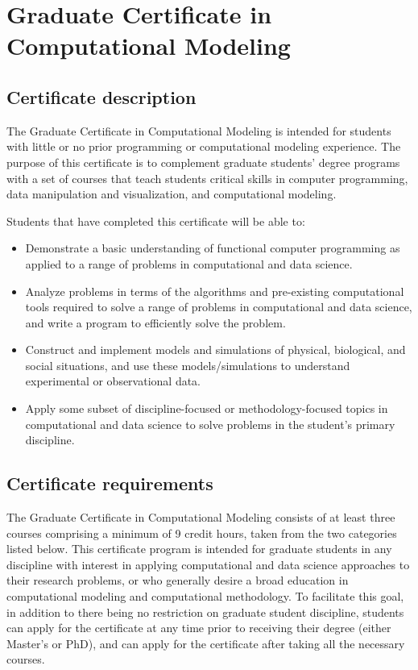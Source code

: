 \section{Graduate Certificate in Computational Modeling}
\label{sec:cert_model}

\subsection{Certificate description}

The Graduate Certificate in Computational Modeling is intended for
students with little or no prior programming or computational modeling
experience. The purpose of this certificate is to complement graduate
students' degree programs with a set of courses that teach students
critical skills in computer programming, data manipulation and
visualization, and computational modeling.  

\vspace{2mm}

\noindent
Students that have completed this certificate will be able to: 

\begin{itemize} 
\item  Demonstrate a basic understanding of functional computer
  programming as applied to a range of problems in computational and
  data science.  

\item  Analyze problems in terms of the algorithms and pre-existing
  computational tools required to solve a range of problems in
  computational and data science, and write a program to efficiently
  solve the problem.  

\item  Construct and implement models and simulations of physical,
  biological, and social situations, and use these models/simulations
  to understand experimental or observational data.  

\item  Apply some subset of discipline-focused or methodology-focused
topics in computational and data science to solve problems in the
student’s primary discipline.

\end{itemize}

\subsection{Certificate requirements}

The Graduate Certificate in Computational Modeling consists of at least
three courses comprising a minimum of 9 credit hours, taken from the
two categories listed below.  This certificate program is intended for
graduate students in any discipline with interest in applying
computational and data science approaches to their research problems,
or who generally desire a broad education in computational modeling
and computational methodology.  To facilitate this goal, in addition
to there being no restriction on graduate student discipline, students
can apply for the certificate at any time prior to receiving their
degree (either Master’s or PhD), and can apply for the certificate
after taking all the necessary courses.  

